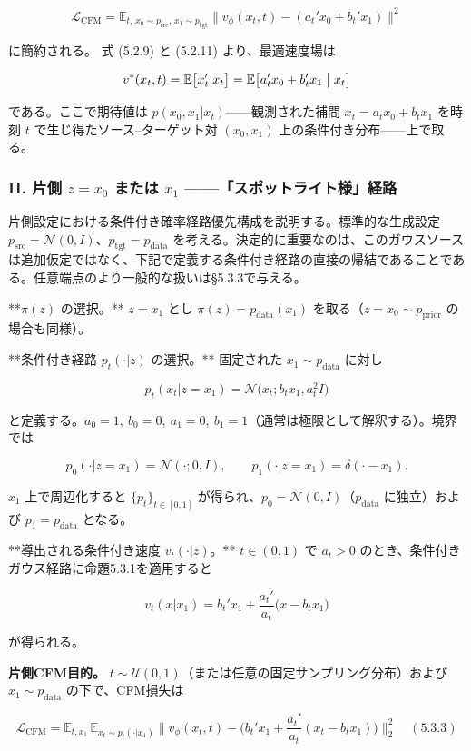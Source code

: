 \[
\mathcal{L}_{\mathrm{CFM}}=\mathbb{E}_{t,\,x_0\sim p_{\mathrm{src}},\,x_1\sim p_{\mathrm{tgt}}}\bigl\|v_\phi(x_t,t)-(a_t'x_0+b_t'x_1)\bigr\|^2
\]


に簡約される。
式 (5.2.9) と (5.2.11) より、最適速度場は

\[
v^*(x_t,t)=\mathbb{E}\bigl[x_t'|x_t\bigr]=\mathbb{E}\bigl[a_t'x_0+b_t'x_1\bigm|x_t\bigr]
\]


である。ここで期待値は $p(x_0,x_1|x_t)$——観測された補間 $x_t=a_t x_0+b_t x_1$ を時刻 $t$ で生じ得たソース–ターゲット対 $(x_0,x_1)$ 上の条件付き分布——上で取る。

\subsubsection*{II. 片側 $z=x_0$ または $x_1$ ——「スポットライト様」経路}


片側設定における条件付き確率経路優先構成を説明する。標準的な生成設定 $p_{\mathrm{src}}=\mathcal{N}(0,I)$、$p_{\mathrm{tgt}}=p_{\mathrm{data}}$ を考える。決定的に重要なのは、このガウスソースは追加仮定ではなく、下記で定義する条件付き経路の直接の帰結であることである。任意端点のより一般的な扱いは§5.3.3で与える。

**$\pi(z)$ の選択。** $z=x_1$ とし $\pi(z)=p_{\mathrm{data}}(x_1)$ を取る（$z=x_0\sim p_{\mathrm{prior}}$ の場合も同様）。

**条件付き経路 $p_t(\cdot|z)$ の選択。** 固定された $x_1\sim p_{\mathrm{data}}$ に対し

\[
p_t(x_t|z=x_1)=\mathcal{N}\bigl(x_t;b_t x_1,a_t^2 I\bigr)
\]


と定義する。$a_0=1,\ b_0=0,\ a_1=0,\ b_1=1$（通常は極限として解釈する）。境界では

\[
p_0(\cdot|z=x_1)=\mathcal{N}(\cdot;0,I),\qquad p_1(\cdot|z=x_1)=\delta(\cdot-x_1).
\]


$x_1$ 上で周辺化すると $\{p_t\}_{t\in[0,1]}$ が得られ、$p_0=\mathcal{N}(0,I)$（$p_{\mathrm{data}}$ に独立）および $p_1=p_{\mathrm{data}}$ となる。

**導出される条件付き速度 $v_t(\cdot|z)$。** $t\in(0,1)$ で $a_t>0$ のとき、条件付きガウス経路に命題5.3.1を適用すると

\[
v_t(x|x_1)=b_t'x_1+\frac{a_t'}{a_t}\bigl(x-b_t x_1\bigr)
\]


が得られる。

\textbf{片側CFM目的。} $t\sim\mathcal{U}(0,1)$（または任意の固定サンプリング分布）および $x_1\sim p_{\mathrm{data}}$ の下で、CFM損失は

\[
\mathcal{L}_{\mathrm{CFM}}=\mathbb{E}_{t,x_1}\,\mathbb{E}_{x_t\sim p_t(\cdot|x_1)}\Biggl\|v_\phi(x_t,t)-\Biggl(b_t'x_1+\frac{a_t'}{a_t}(x_t-b_t x_1)\Biggr)\Biggr\|_2^2 \quad (5.3.3)
\]



